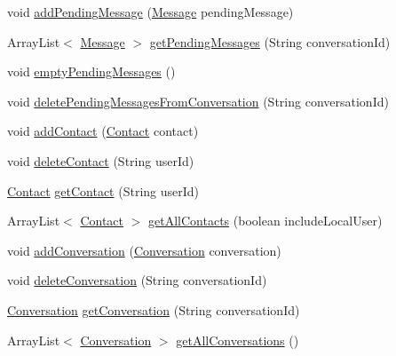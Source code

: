 \begin{DoxyCompactItemize}
\item 
void \hyperlink{classcom_1_1lbros_1_1epicchat_1_1_database_a362cf97145d3a9c9425c4d3d4b109465}{add\-Pending\-Message} (\hyperlink{classcom_1_1lbros_1_1epicchat_1_1_message}{Message} pending\-Message)
\item 
Array\-List$<$ \hyperlink{classcom_1_1lbros_1_1epicchat_1_1_message}{Message} $>$ \hyperlink{classcom_1_1lbros_1_1epicchat_1_1_database_a6b624069710df5074ca83d4b576664e9}{get\-Pending\-Messages} (String conversation\-Id)
\item 
void \hyperlink{classcom_1_1lbros_1_1epicchat_1_1_database_a667530df5babf6aa4a99bc56df25c454}{empty\-Pending\-Messages} ()
\item 
void \hyperlink{classcom_1_1lbros_1_1epicchat_1_1_database_abd33c8b84b5357de1eb76ab9cfb4da6c}{delete\-Pending\-Messages\-From\-Conversation} (String conversation\-Id)
\item 
void \hyperlink{classcom_1_1lbros_1_1epicchat_1_1_database_a62006bda78c2a6aa5900532a006f91ce}{add\-Contact} (\hyperlink{classcom_1_1lbros_1_1epicchat_1_1_contact}{Contact} contact)
\item 
void \hyperlink{classcom_1_1lbros_1_1epicchat_1_1_database_a897d537b35791879f21c3ae72762d55b}{delete\-Contact} (String user\-Id)
\item 
\hyperlink{classcom_1_1lbros_1_1epicchat_1_1_contact}{Contact} \hyperlink{classcom_1_1lbros_1_1epicchat_1_1_database_a184d7a5234574f8f3cc706ccaf6bf4d8}{get\-Contact} (String user\-Id)
\item 
Array\-List$<$ \hyperlink{classcom_1_1lbros_1_1epicchat_1_1_contact}{Contact} $>$ \hyperlink{classcom_1_1lbros_1_1epicchat_1_1_database_a5f6162f0b116075bc3d91b7bb01a1358}{get\-All\-Contacts} (boolean include\-Local\-User)
\item 
void \hyperlink{classcom_1_1lbros_1_1epicchat_1_1_database_a1529ac5122015e13f5eb3cbf05c774d4}{add\-Conversation} (\hyperlink{classcom_1_1lbros_1_1epicchat_1_1_conversation}{Conversation} conversation)
\item 
void \hyperlink{classcom_1_1lbros_1_1epicchat_1_1_database_ac2a5e0009484ee8c064af5944a044d6a}{delete\-Conversation} (String conversation\-Id)
\item 
\hyperlink{classcom_1_1lbros_1_1epicchat_1_1_conversation}{Conversation} \hyperlink{classcom_1_1lbros_1_1epicchat_1_1_database_a16dcff5a54f3bd1024e0227b2b39337a}{get\-Conversation} (String conversation\-Id)
\item 
Array\-List$<$ \hyperlink{classcom_1_1lbros_1_1epicchat_1_1_conversation}{Conversation} $>$ \hyperlink{classcom_1_1lbros_1_1epicchat_1_1_database_a22e6f0f96ccd881b8c22d0a57e557b5b}{get\-All\-Conversations} ()

\end{DoxyCompactItemize}
